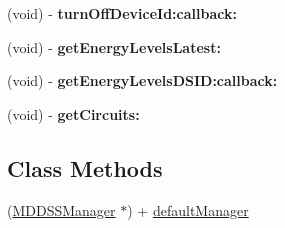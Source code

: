\begin{DoxyCompactItemize}
\item 
\hypertarget{interface_m_d_d_s_s_manager_ac96629f2d573ee6acb469892c649533c}{(void) -\/ {\bfseries turn\-Off\-Device\-Id\-:callback\-:}}\label{interface_m_d_d_s_s_manager_ac96629f2d573ee6acb469892c649533c}

\item 
\hypertarget{interface_m_d_d_s_s_manager_a0ade895ec94f02001b59067b835c6ed0}{(void) -\/ {\bfseries get\-Energy\-Levels\-Latest\-:}}\label{interface_m_d_d_s_s_manager_a0ade895ec94f02001b59067b835c6ed0}

\item 
\hypertarget{interface_m_d_d_s_s_manager_aa4524948db08b3a0a623db564301ef2a}{(void) -\/ {\bfseries get\-Energy\-Levels\-D\-S\-I\-D\-:callback\-:}}\label{interface_m_d_d_s_s_manager_aa4524948db08b3a0a623db564301ef2a}

\item 
\hypertarget{interface_m_d_d_s_s_manager_ae616b77a6cd640f66217ea2aa70bc8a1}{(void) -\/ {\bfseries get\-Circuits\-:}}\label{interface_m_d_d_s_s_manager_ae616b77a6cd640f66217ea2aa70bc8a1}

\end{DoxyCompactItemize}
\subsection*{Class Methods}
\begin{DoxyCompactItemize}
\item 
(\hyperlink{interface_m_d_d_s_s_manager}{M\-D\-D\-S\-S\-Manager} $\ast$) + \hyperlink{interface_m_d_d_s_s_manager_af0359d38979df1d414575dfb7aa6b537}{default\-Manager}
\end{DoxyCompactItemize}

